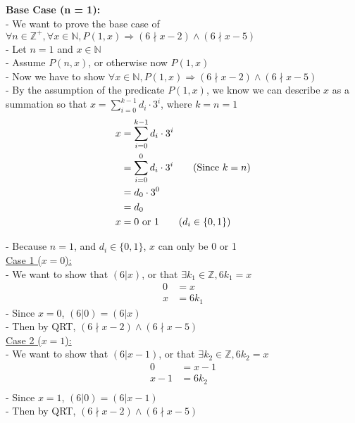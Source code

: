 \documentclass[20pt]{article}
\begin{document}
\begin{enumerate}
\textbf{Base Case (n = 1):}\\
- We want to prove the base case of $\forall n\in\mathbb{Z}^+,\forall x\in\mathbb{N},P(1,x) \Rightarrow (6\nmid x-2) \land (6\nmid x-5)$\\
- Let $n = 1$ and $x \in\mathbb{N}$\\
- Assume $P(n,x)$, or otherwise now $P(1,x)$\\
- Now we have to show $\forall x\in\mathbb{N},P(1,x) \Rightarrow (6\nmid x-2) \land (6\nmid x-5)$\\
- By the assumption of the predicate $P(1,x)$, we know we can describe $x$ as a summation so that $x = \sum_{i = 0}^{k-1}d_i\cdot 3^i$, where $k = n = 1$
\begin{align*}
    x &= \sum_{i = 0}^{k-1}d_i\cdot 3^i \nonumber\\
    &= \sum_{i = 0}^{0}d_i\cdot 3^i\nonumber\tag{Since $k = n$}\\
    &= d_0\cdot 3^0\nonumber\\
    &= d_0\nonumber\\
    x &= \text{0 or 1} \tag{$d_i\in\{0,1\}$}
\end{align*}

- Because $n = 1$, and $d_i\in\{0,1\}$, $x$ can only be 0 or 1\\

\underline{Case 1 ($x = 0$):}\\
- We want to show that $(6|x)$, or that $\exists k_1 \in\mathbb{Z}, 6k_1 = x$\\
\begin{align*}
    0 &= x\tag{Since assumption that $x = 0$}\\
    x &= 6k_1 \tag{Since we can let $k_1 = 0$, then $6|x$}
\end{align*}
- Since $x = 0$, $(6|0) = (6|x)$\\
- Then by QRT, $(6\nmid x-2) \land (6\nmid x-5)$\\


\underline{Case 2 ($x = 1$):}\\
- We want to show that $(6|x-1)$, or that $\exists k_2 \in\mathbb{Z}, 6k_2 = x$\\
\begin{align*}
    0 &= x-1 \tag{Since assumption that $x = 1$}\\ 
    x-1 &= 6k_2\tag{Since we can let $k_2 = 0$, then $6|x - 1$}\\
\end{align*}
- Since $x = 1$, $(6|0) = (6|x-1)$\\
- Then by QRT, $(6\nmid x-2) \land (6\nmid x-5)$\\\\


\end{enumerate}
\end{document}
